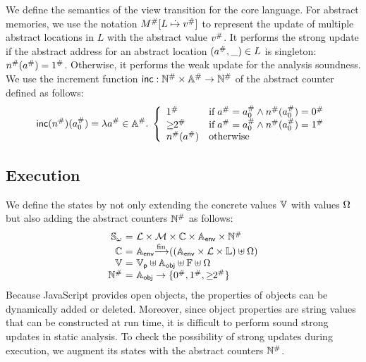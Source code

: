 We define the semantics of the view transition for the core language.  For abstract
memories, we use the notation ${M}^{\#}[L \;\dot{\mapsto}\; {v}^{\#}]$ to represent the
update of multiple abstract locations in $L$ with the abstract value ${v}^{\#}$.
It performs the strong update if the abstract address for an abstract location
$({a}^{\#}, \_) \in L$ is singleton: ${n}^{\#}({a}^{\#}) = {1}^{\#}$.
Otherwise, it performs the weak update for the analysis soundness.  We use
the increment function $\textsf{inc}: {\mathbb{N}}^{\#} \times {\mathbb{A}}^{\#} \rightarrow
{\mathbb{N}}^{\#}$ of the abstract counter defined as follows:
\[
  \textsf{inc}({n}^{\#})({a}^{\#}_0) = \lambda {a}^{\#} \in {\mathbb{A}}^{\#}. \; \left\{
    \begin{array}{ll}
      {1}^{\#} & \text{if} \; {a}^{\#} = {a}^{\#}_0 \wedge
      {n}^{\#}({a}^{\#}_0) = {0}^{\#}\\
      {\geq\!\!2}^{\#} & \text{if} \; {a}^{\#} = {a}^{\#}_0 \wedge
      {n}^{\#}({a}^{\#}_0) = {1}^{\#}\\
      {n}^{\#}({a}^{\#}) & \text{otherwise}
    \end{array}
  \right.
\]


\subsection{{\SealeD} Execution}

We define the {\sealed} states by not only extending the concrete values
$\mathbb{V}$ with {\sealed} values $\Omega$ but also adding the abstract counters
${\mathbb{N}}^{\#}$ as follows:
\[
  \begin{array}{r@{~}c@{~}l}
    \symbstset &=& \labset \times \memset \times \ctxtset \times \eaddrset
    \times \abscountset\\
    \ctxtset &=& \eaddrset \finmap ((\eaddrset \times \labset \times \locset)
    \uplus \symbset)\\
    \valset &=& \pvalset \uplus \oaddrset \uplus \fvalset \uplus \symbset\\
    \abscountset &=& \oaddrset \rightarrow \{ \abszero, \absone, \absmany \}\\
  \end{array}
\]
Because JavaScript provides open objects, the properties of objects can be dynamically added or deleted.
Moreover, since object properties are string values that can be constructed at run time,
it is difficult to perform sound strong updates in static analysis.
To check the possibility of strong updates during {\sealed} execution,
we augment its states with the abstract counters ${\mathbb{N}}^{\#}$.

